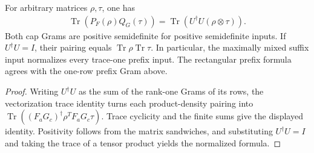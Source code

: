 \begin{lemma}
    \label{thm:mpu_global_cap_gram_normalization}
    \leanok
    For arbitrary matrices $\rho,\tau$, one has
    \begin{align}
        \operatorname{Tr}(P_F(\rho)Q_G(\tau))
        =\operatorname{Tr}(U^\dagger U(\rho\otimes\tau)).
    \end{align}
    Both cap Grams are positive semidefinite for positive semidefinite
    inputs. If $U^\dagger U=I$, their pairing equals
    $\operatorname{Tr}\rho\operatorname{Tr}\tau$.
    In particular, the maximally mixed suffix input normalizes every
    trace-one prefix input. The rectangular prefix formula agrees
    with the one-row prefix Gram above.
\end{lemma}
\begin{proof}\leanok
    Writing $U^\dagger U$ as the sum of the rank-one Grams of its rows,
    the vectorization trace identity turns each product-density
    pairing into $\operatorname{Tr}((F_aG_c)^\dagger\rho^T
        F_aG_c\tau)$. Trace cyclicity and the finite sums give the
    displayed identity. Positivity follows from the matrix
    sandwiches, and substituting $U^\dagger U=I$ and taking the trace of a
    tensor product yields the normalized formula.
\end{proof}

